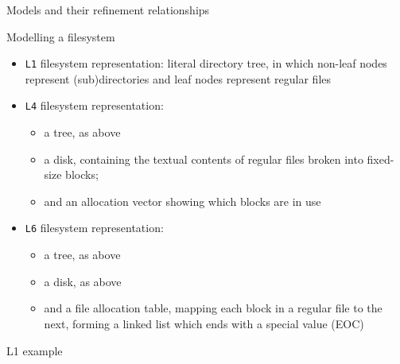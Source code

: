 \documentclass{beamer}
\begin{document}
\begin{frame}{Models and their refinement relationships}
\end{frame}

\begin{frame}{Modelling a filesystem}
  \begin{itemize}
  \item \texttt{L1} filesystem representation: literal
    directory tree, in which non-leaf nodes represent (sub)directories
      and leaf nodes represent regular files
  \item \texttt{L4} filesystem representation:
    \begin{itemize}
    \item a tree, as above
    \item a disk, containing the textual contents of regular files
      broken into fixed-size blocks;
    \item and an allocation vector showing which blocks are in use
    \end{itemize}
  \item \texttt{L6} filesystem representation:
    \begin{itemize}
    \item a tree, as above
    \item a disk, as above
    \item and a file allocation table, mapping each block in a regular
      file to the next, forming a linked list which ends with a
      special value (EOC)
    \end{itemize}
  \end{itemize}
\end{frame}

\begin{frame}{L1 example}
\end{frame}
\end{document}
